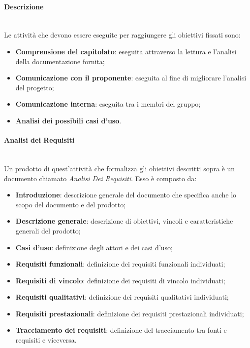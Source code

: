 		\paragraph*{Descrizione}\mbox{}\\ [1mm]
		Le attività che devono essere eseguite per raggiungere gli obiettivi fissati sono:
		\begin{itemize}
			\item \textbf{Comprensione del capitolato}\glo: eseguita attraverso la lettura e l'analisi della documentazione fornita;
			\item \textbf{Comunicazione con il proponente}: eseguita al fine di migliorare l'analisi del progetto\glo;
			\item \textbf{Comunicazione interna}: eseguita tra i membri del gruppo;
			\item \textbf{Analisi dei possibili casi d'uso}\glo.
		\end{itemize}
		\paragraph*{Analisi dei Requisiti}\mbox{}\\ [1mm]
		Un prodotto di quest'attività che formalizza gli obiettivi descritti sopra è un documento chiamato \textit{Analisi Dei Requisiti}. Esso è composto da:
		\begin{itemize}
			\item \textbf{Introduzione}: descrizione generale del documento che specifica anche lo scopo del documento e del prodotto\glo;
			\item \textbf{Descrizione generale}: descrizione di obiettivi, vincoli e caratteristiche generali del prodotto\glo;
			\item \textbf{Casi d'uso}: definizione degli attori e dei casi d'uso\glo;
			\item \textbf{Requisiti funzionali}: definizione dei requisiti funzionali individuati;
			\item \textbf{Requisiti di vincolo}: definizione dei requisiti di vincolo individuati;
			\item \textbf{Requisiti qualitativi}: definizione dei requisiti qualitativi individuati;
			\item \textbf{Requisiti prestazionali}: definizione dei requisiti prestazionali individuati;
			\item \textbf{Tracciamento dei requisiti}: definizione del tracciamento tra fonti e requisiti e viceversa.
		\end{itemize}
